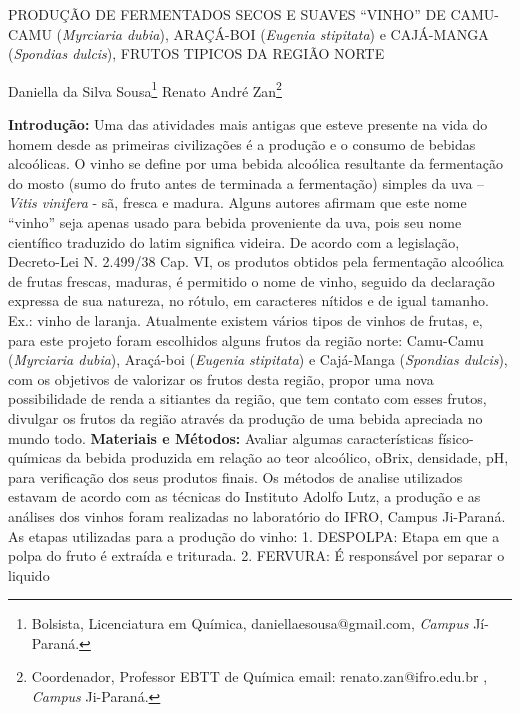 \documentclass[article,12pt,onesidea,4paper,english,brazil]{abntex2}
\begin{document}
	
	
	\frenchspacing 
	
	\begin{center}
		\LARGE PRODUÇÃO DE FERMENTADOS SECOS E SUAVES “VINHO” DE CAMU-CAMU
		(\textit{Myrciaria dubia}), ARAÇÁ-BOI (\textit{Eugenia stipitata}) e CAJÁ-MANGA (\textit{Spondias dulcis}), FRUTOS TIPICOS DA REGIÃO NORTE
		
		\normalsize
		Daniella da Silva Sousa\footnote{Bolsista, Licenciatura em Química, daniellaesousa@gmail.com, \textit{Campus} Jí-Paraná.} 
		Renato André Zan\footnote{Coordenador, Professor EBTT de Química email: renato.zan@ifro.edu.br , \textit{Campus} Ji-Paraná.} 
	\end{center}
	
	\noindent \textbf{Introdução:} Uma das atividades mais antigas que esteve presente na vida do
	homem desde as primeiras civilizações é a produção e o consumo de bebidas
	alcoólicas. O vinho se define por uma bebida alcoólica resultante da fermentação do
	mosto (sumo do fruto antes de terminada a fermentação) simples da uva – \textit{Vitis
	vinifera} - sã, fresca e madura. Alguns autores afirmam que este nome “vinho” seja
	apenas usado para bebida proveniente da uva, pois seu nome científico traduzido do
	latim significa videira. De acordo com a legislação, Decreto-Lei N. 2.499/38 Cap. VI,
	os produtos obtidos pela fermentação alcoólica de frutas frescas, maduras, é
	permitido o nome de vinho, seguido da declaração expressa de sua natureza, no
	rótulo, em caracteres nítidos e de igual tamanho. Ex.: vinho de laranja. Atualmente
	existem vários tipos de vinhos de frutas, e, para este projeto foram escolhidos alguns
	frutos da região norte: Camu-Camu (\textit{Myrciaria dubia}), Araçá-boi (\textit{Eugenia stipitata}) e Cajá-Manga (\textit{Spondias dulcis}), com os objetivos de valorizar os frutos desta região, propor uma nova possibilidade de renda a sitiantes da região, que tem contato com esses frutos, divulgar os frutos da região através da produção de uma bebida
	apreciada no mundo todo. \textbf{Materiais e Métodos:} Avaliar algumas características
	físico-químicas da bebida produzida em relação ao teor alcoólico, oBrix, densidade,
	pH, para verificação dos seus produtos finais. Os métodos de analise utilizados
	estavam de acordo com as técnicas do Instituto Adolfo Lutz, a produção e as
	análises dos vinhos foram realizadas no laboratório do IFRO, Campus Ji-Paraná. As
	etapas utilizadas para a produção do vinho: 1. DESPOLPA: Etapa em que a polpa
	do fruto é extraída e triturada. 2. FERVURA: É responsável por separar o liquido
\end{document}
